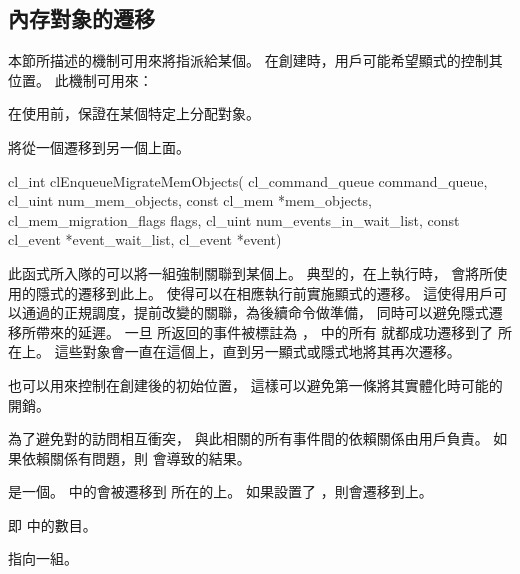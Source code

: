 \subsection{內存對象的遷移}

本節所描述的機制可用來將指派給某個。
在創建時，用戶可能希望顯式的控制其位置。
此機制可用來：
\startigBase
\item 在使用前，保證在某個特定上分配對象。

\item 將從一個遷移到另一個上面。
\stopigBase


\startCLFUNC
cl_int clEnqueueMigrateMemObjects(
			cl_command_queue command_queue,
			cl_uint num_mem_objects,
			const cl_mem *mem_objects,
			cl_mem_migration_flags flags,
			cl_uint num_events_in_wait_list,
			const cl_event *event_wait_list,
			cl_event *event)
\stopCLFUNC

此函式所入隊的可以將一組強制關聯到某個上。
典型的，在上執行時，
會將所使用的隱式的遷移到此上。
 使得可以在相應執行前實施顯式的遷移。
這使得用戶可以通過的正規調度，提前改變的關聯，為後續命令做準備，
同時可以避免隱式遷移所帶來的延遲。
一旦  所返回的事件被標註為 ，
 中的所有
就都成功遷移到了  所在上。
這些對象會一直在這個上，直到另一顯式或隱式地將其再次遷移。

 也可以用來控制在創建後的初始位置，
這樣可以避免第一條將其實體化時可能的開銷。

為了避免對的訪問相互衝突，
與此相關的所有事件間的依賴關係由用戶負責。
如果依賴關係有問題，則  會導致的結果。

 是一個。
 中的會被遷移到  所在的上。
如果設置了 ，則會遷移到上。

 即  中的數目。

 指向一組。

